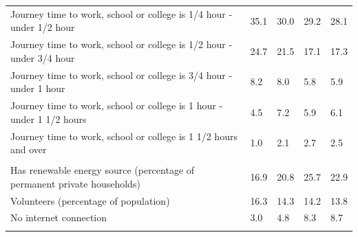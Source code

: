 \documentclass{article}
\begin{document}
\begin{table}[h]
\begin{tabular}{KTTTT}
Journey time to work, school or college is 1/4 hour - under 1/2 hour & 35.1& 30.0& 29.2& 28.1\\
Journey time to work, school or college is 1/2 hour - under 3/4 hour & 24.7& 21.5& 17.1& 17.3\\
Journey time to work, school or college is 3/4 hour - under 1 hour & 8.2& 8.0& 5.8& 5.9\\
Journey time to work, school or college is 1 hour - under 1 1/2 hours & 4.5& 7.2& 5.9& 6.1\\
Journey time to work, school or college is 1 1/2 hours and over & 1.0& 2.1& 2.7& 2.5\\
\hline
    \\ 
    \hline
Has renewable energy source (percentage of permanent private households) & 16.9& 20.8& 25.7& 22.9\\
    \hline
Volunteers (percentage of population) & 16.3& 14.3& 14.2& 13.8\\
    \hline
No internet connection& 3.0& 4.8& 8.3& 8.7\\
\hline
\end{tabular}
\end{table}
\end{document}
